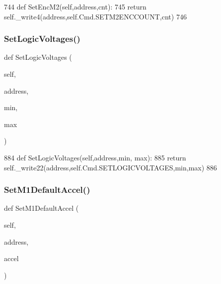 \begin{DoxyCode}
744     \textcolor{keyword}{def }SetEncM2(self,address,cnt):
745         \textcolor{keywordflow}{return} self.\_write4(address,self.Cmd.SETM2ENCCOUNT,cnt)
746 
\end{DoxyCode}
\mbox{\label{classtoxic__hardware_1_1roboclaw__3_1_1Roboclaw_a9a09e4eb5551bbd1738c4bec30c9519a}} 
\subsubsection{\texorpdfstring{Set\+Logic\+Voltages()}{SetLogicVoltages()}}
{\footnotesize\ttfamily def Set\+Logic\+Voltages (\begin{DoxyParamCaption}\item[{}]{self,  }\item[{}]{address,  }\item[{}]{min,  }\item[{}]{max }\end{DoxyParamCaption})}


\begin{DoxyCode}
884     \textcolor{keyword}{def }SetLogicVoltages(self,address,min, max):
885         \textcolor{keywordflow}{return} self.\_write22(address,self.Cmd.SETLOGICVOLTAGES,min,max)
886         
\end{DoxyCode}
\mbox{\label{classtoxic__hardware_1_1roboclaw__3_1_1Roboclaw_a23dc1a25b115d6e1cecdfacdaef1a723}} 
\subsubsection{\texorpdfstring{Set\+M1\+Default\+Accel()}{SetM1DefaultAccel()}}
{\footnotesize\ttfamily def Set\+M1\+Default\+Accel (\begin{DoxyParamCaption}\item[{}]{self,  }\item[{}]{address,  }\item[{}]{accel }\end{DoxyParamCaption})}


